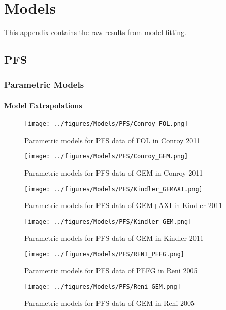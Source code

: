 \chapter{Models}\label{modelsApp}

This appendix contains the raw results from model fitting. 

\section{PFS}
\subsection{Parametric Models}\label{modelsApp_PFS_param}
\subsubsection*{Model Extrapolations}

\begin{figure}[h]
    \texttt{[image: ../figures/Models/PFS/Conroy\_FOL.png]}
    \caption{Parametric models for PFS data of FOL in Conroy 2011}
\end{figure}

\begin{figure}[h]
    \texttt{[image: ../figures/Models/PFS/Conroy\_GEM.png]}
    \caption{Parametric models for PFS data of GEM in Conroy 2011}
\end{figure}

\begin{figure}[h]
    \texttt{[image: ../figures/Models/PFS/Kindler\_GEMAXI.png]}
    \caption{Parametric models for PFS data of GEM+AXI in Kindler 2011}
\end{figure}

\begin{figure}[h]
    \texttt{[image: ../figures/Models/PFS/Kindler\_GEM.png]}
    \caption{Parametric models for PFS data of GEM in Kindler 2011}
\end{figure}

\begin{figure}[h]
    \texttt{[image: ../figures/Models/PFS/RENI\_PEFG.png]}
    \caption{Parametric models for PFS data of PEFG in Reni 2005}
\end{figure}

\begin{figure}[h]
    \texttt{[image: ../figures/Models/PFS/Reni\_GEM.png]}
    \caption{Parametric models for PFS data of GEM in Reni 2005}
\end{figure}

